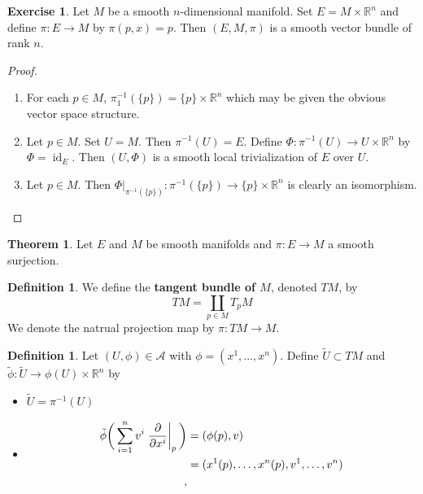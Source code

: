 \documentclass[12pt]{amsart}
\theoremstyle{definition}
\newtheorem{defn}[definition]{Definition}
\newtheorem{thm}[definition]{Theorem}
\newtheorem{ex}[definition]{Exercise}
\newcommand{\R}{\mathbb{R}}
\newcommand{\MA}{\mathcal{A}}
\newcommand{\tU}{\tilde{U}}
\newcommand{\tphi}{\tilde{\phi}}
\DeclareMathOperator{\id}{id}
\begin{document}
\begin{ex}
Let $M$ be a smooth $n$-dimensional manifold. Set $E = M \times \R^n$ and define $\pi: E \rightarrow M$ by $\pi(p, x) = p $. Then $(E, M, \pi)$ is a smooth vector bundle of rank $n$.
\end{ex}

\begin{proof}\
\begin{enumerate}
\item For each $p \in M$, $\pi_1^{-1}(\{p\}) = \{p\} \times \R^n$ which may be given the obvious vector space structure.
\item Let $p \in M$. Set $U = M$. Then $\pi^{-1}(U) = E$. Define $\Phi: \pi^{-1}(U) \rightarrow U \times \R^n$ by $\Phi = \id_E$. Then $(U, \Phi)$ is a smooth local trivialization of $E$ over $U$.   
\item Let $p \in M$. Then $\Phi|_{\pi^{-1}(\{p\})}: \pi^{-1}(\{p\}) \rightarrow \{p\} \times \R^n$ is clearly an isomorphism. 
\end{enumerate}
\end{proof}

	\begin{thm}
		Let $E$ and $M$ be smooth manifolds and $\pi: E \rightarrow M$ a smooth surjection.
	\end{thm}
	
	
	\newpage
	
	\begin{defn}
		We define the \textbf{tangent bundle of $M$}, denoted $TM$, by $$TM = \coprod_{p \in M} T_pM$$ 
		We denote the natrual projection map by $\pi: TM \rightarrow M$.
	\end{defn}
	
	\begin{defn}
		Let $(U, \phi) \in \MA$ with $\phi = (x^1, \dots, x^n)$. Define $\tilde{U} \subset TM$ and $\tilde{\phi}: \tilde{U} \rightarrow \phi(U) \times \R^{n}$ by  
		\begin{itemize}
			\item $\tU = \pi^{-1}(U)$
			\item 
			\begin{align*}
				\tphi \bigg(\sum\limits_{i =1}^n v^i \eval{\pdv{x^i}}_p \bigg) 
				&= (\phi(p), v) \\
				&= (x^1(p), \dots, x^n(p), v^1, \dots, v^n) \\
, 			\end{align*}
		\end{itemize}
	\end{defn}
\end{document}
